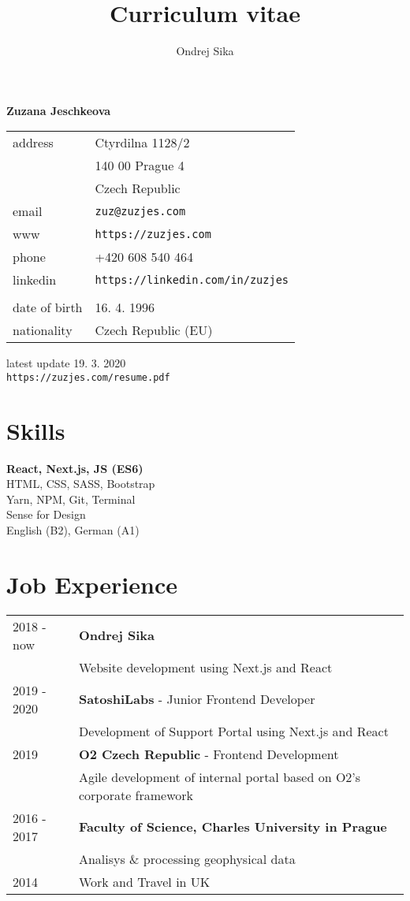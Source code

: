 \documentclass[12pt,a4paper]{article}
\title{Curriculum vitae}
\author{Ondrej Sika}
\begin{document}
\begin{center}
{\LARGE \bf Zuzana Jeschkeova}\\
\vspace*{0.2cm}
\begin{tabular}{R{8cm}L{8cm}}
address & Ctyrdilna 1128/2\\
 & 140 00 Prague 4\\
 & Czech Republic\\
email & \texttt{zuz@zuzjes.com}\\
www & \texttt{https://zuzjes.com}\\
phone & +420 608 540 464\\
linkedin & \texttt{https://linkedin.com/in/zuzjes}\\
\\
date of birth & 16. 4. 1996\\
nationality & Czech Republic (EU)\\
\end{tabular}

\vspace*{0.3cm}
{\hfill latest update 19. 3. 2020}\\
{\hfill \texttt{https://zuzjes.com/resume.pdf}}
\end{center}

\section*{Skills}
{\bf React, Next.js, JS (ES6)}\\
HTML, CSS, SASS, Bootstrap\\
Yarn, NPM, Git, Terminal\\
Sense for Design\\
English (B2), German (A1)\\

\section*{Job Experience}
\begin{tabular}{@{}p{2cm}l}
2018 - now & {\bf Ondrej Sika}\\
 & Website development using Next.js and React\\
2019 - 2020 & {\bf SatoshiLabs} - Junior Frontend Developer\\
  & Development of Support Portal using Next.js and React\\
2019 & {\bf O2 Czech Republic} - Frontend Development\\
 & Agile development of internal portal based on O2's corporate framework\\
2016 - 2017 & {\bf Faculty of Science, Charles University in Prague}\\
 & Analisys \& processing geophysical data\\
2014 & Work and Travel in UK\\
\end{tabular}\\
\end{document}
